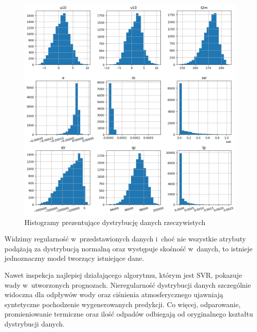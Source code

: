 \begin{figure}[H]
    \centering
    \includegraphics[width=\textwidth]{images/hist.png}
    \caption[Histogramy dla danych rzeczywistych]{Histogramy prezentujące dystrybucję danych rzeczywistych}
    \label{real-hist}
\end{figure}

Widzimy regularność w~przedstawionych danych i~choć nie wszystkie atrybuty podążają za dystrybucją normalną 
oraz występuje skośność w~danych, to istnieje jednoznaczny model tworzący istniejące dane.

Nawet inspekcja najlepiej działającego algorytmu, którym jest SVR, pokazuje wady w~utworzonych 
prognozach. Nieregularność dystrybucji danych szczególnie widoczna dla odpływów wody oraz
ciśnienia atmosferycznego ujawniają syntetyczne pochodzenie wygenerowanych predykcji. 
Co więcej, odparowanie, promieniowanie termiczne oraz ilość odpadów odbiegają od oryginalnego kształtu
dystrybucji danych.

